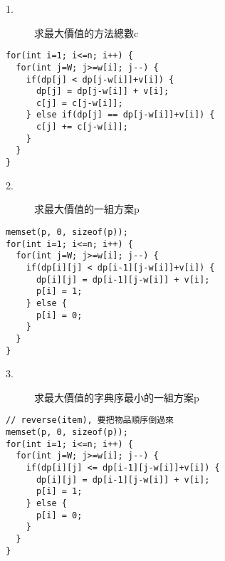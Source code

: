 \begin{center}
  \underline{  \bf{}  }
\end{center}

\begin{description}
  \item[1.] 求最大價值的方法總數c
\end{description}
\begin{lstlisting}
for(int i=1; i<=n; i++) {
  for(int j=W; j>=w[i]; j--) {
    if(dp[j] < dp[j-w[i]]+v[i]) {
      dp[j] = dp[j-w[i]] + v[i];
      c[j] = c[j-w[i]];
    } else if(dp[j] == dp[j-w[i]]+v[i]) {
      c[j] += c[j-w[i]];
    }
  }
}
\end{lstlisting}

\begin{description}
  \item[2.] 求最大價值的一組方案p
\end{description}
\begin{lstlisting}
memset(p, 0, sizeof(p));
for(int i=1; i<=n; i++) {
  for(int j=W; j>=w[i]; j--) {
    if(dp[i][j] < dp[i-1][j-w[i]]+v[i]) {
      dp[i][j] = dp[i-1][j-w[i]] + v[i];
      p[i] = 1;
    } else {
      p[i] = 0;
    }
  }
}
\end{lstlisting}

\begin{description}
  \item[3.] 求最大價值的字典序最小的一組方案p
\end{description}
\begin{lstlisting}
// reverse(item), 要把物品順序倒過來
memset(p, 0, sizeof(p));
for(int i=1; i<=n; i++) {
  for(int j=W; j>=w[i]; j--) {
    if(dp[i][j] <= dp[i-1][j-w[i]]+v[i]) {
      dp[i][j] = dp[i-1][j-w[i]] + v[i];
      p[i] = 1;
    } else {
      p[i] = 0;
    }
  }
}
\end{lstlisting}